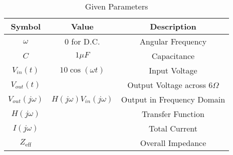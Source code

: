 \begin{table}[!h]
    \centering
    \begin{tabular}{|c|c|c|}
    \hline
       \textbf{Symbol}  &  \textbf{Value}  &  \textbf{Description}\\
    \hline
       $\omega$  &  $0$ for D.C. &  Angular Frequency\\
    \hline
        $C$ & $1\mu F$ & Capacitance \\
    \hline
        $V_{in}(t)$ & $10\cos(\omega t)$ & Input Voltage\\
    \hline
        $V_{out}(t)$ &  & Output Voltage across $6\Omega$\\
    \hline
        $V_{out}(j\omega)$ & $H(j\omega)V_{in}(j\omega)$ & Output in Frequency Domain\\
    \hline
        $H(j\omega)$ &  & Transfer Function\\
    \hline
        $I(j\omega)$ & & Total Current\\
    \hline
        $Z_{\text{eff}}$ & & Overall Impedance\\
    \hline
    \end{tabular}
    \caption{Given Parameters}
    \label{tab:1_gate.22.ee.31}
\end{table}
